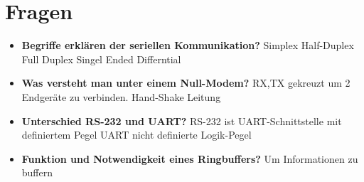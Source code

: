 \section{Fragen}
\begin{itemize}
	\item \textbf{Begriffe erklären der seriellen Kommunikation?}
	\subitem Simplex
	\subitem Half-Duplex
	\subitem Full Duplex
	\subitem Singel Ended
	\subitem Differntial
	
	\item \textbf{Was versteht man unter einem Null-Modem?}
	\subitem RX,TX gekreuzt um 2 Endgeräte zu verbinden. Hand-Shake Leitung
	
	\item \textbf{Unterschied RS-232 und UART?}
	\subitem RS-232 ist UART-Schnittstelle mit definiertem Pegel
	\subitem UART nicht definierte Logik-Pegel
	
	\item \textbf{Funktion und Notwendigkeit eines Ringbuffers?}
	\subitem Um Informationen zu buffern
\end{itemize}




















